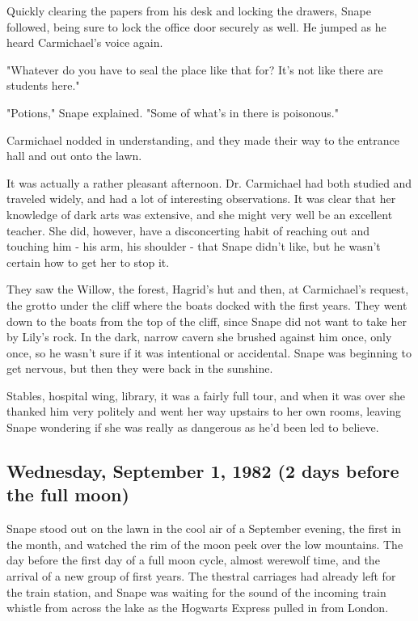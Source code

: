 Quickly clearing the papers from his desk and locking the drawers, Snape followed, being sure to lock the office door securely as well. He jumped as he heard Carmichael's voice again.

"Whatever do you have to seal the place like that for? It's not like there are students here."

"Potions," Snape explained. "Some of what's in there is poisonous."

Carmichael nodded in understanding, and they made their way to the entrance hall and out onto the lawn.

It was actually a rather pleasant afternoon. Dr. Carmichael had both studied and traveled widely, and had a lot of interesting observations. It was clear that her knowledge of dark arts was extensive, and she might very well be an excellent teacher. She did, however, have a disconcerting habit of reaching out and touching him - his arm, his shoulder - that Snape didn't like, but he wasn't certain how to get her to stop it.

They saw the Willow, the forest, Hagrid's hut and then, at Carmichael's request, the grotto under the cliff where the boats docked with the first years. They went down to the boats from the top of the cliff, since Snape did not want to take her by Lily's rock. In the dark, narrow cavern she brushed against him once, only once, so he wasn't sure if it was intentional or accidental. Snape was beginning to get nervous, but then they were back in the sunshine.

Stables, hospital wing, library, it was a fairly full tour, and when it was over she thanked him very politely and went her way upstairs to her own rooms, leaving Snape wondering if she was really as dangerous as he'd been led to believe.

\subsection{Wednesday, September 1, 1982 (2 days before the full moon)}

Snape stood out on the lawn in the cool air of a September evening, the first in the month, and watched the rim of the moon peek over the low mountains. The day before the first day of a full moon cycle, almost werewolf time, and the arrival of a new group of first years. The thestral carriages had already left for the train station, and Snape was waiting for the sound of the incoming train whistle from across the lake as the Hogwarts Express pulled in from London.

